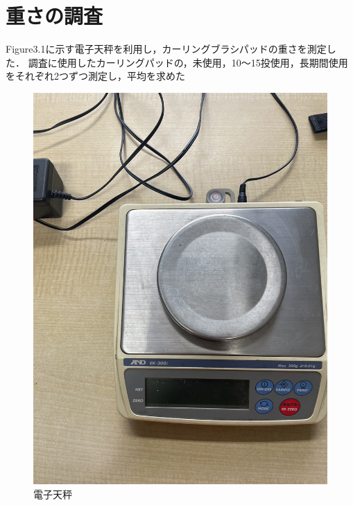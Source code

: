 \documentclass[main]{subfiles}
\begin{document}
\section{重さの調査}
Figure3.1に示す電子天秤を利用し，カーリングブラシパッドの重さを測定した．
調査に使用したカーリングパッドの，未使用，10～15投使用，長期間使用をそれぞれ2つずつ測定し，平均を求めた
\begin{figure}[htbp]
    \centering
    \includegraphics[width=0.5\linewidth, height=0.6\linewidth]{figures/denshitenbinn.jpg}
    \caption{電子天秤}
    \label{fig:label}
\end{figure}
\end{document}
